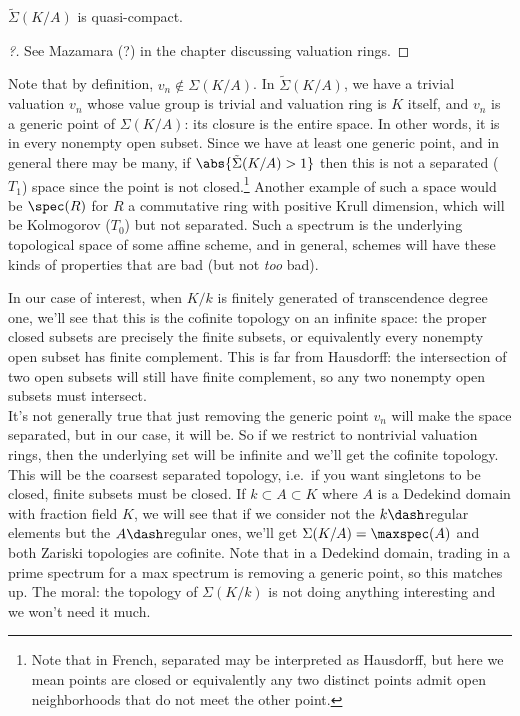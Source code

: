 \begin{theorem}[Zariski]

\(\tilde \Sigma(K/A)\) is quasi-compact.

\end{theorem}

\begin{proof}[?]

See Mazamara (?) in the chapter discussing valuation rings.

\end{proof}

Note that by definition, \(v_n \not\in \Sigma(K/A)\). In
\(\tilde \Sigma(K/A)\), we have a trivial valuation \(v_n\) whose value
group is trivial and valuation ring is \(K\) itself, and \(v_n\) is a
generic point of \(\Sigma(K/A)\): its closure is the entire space. In
other words, it is in every nonempty open subset. Since we have at least
one generic point, and in general there may be many, if
\(\abs{\tilde\Sigma(K/A) > 1}\) then this is not a separated (\(T_1\))
space since the point is not closed.\footnote{Note that in French,
  separated may be interpreted as Hausdorff, but here we mean points are
  closed or equivalently any two distinct points admit open
  neighborhoods that do not meet the other point.} Another example of
such a space would be \(\spec(R)\) for \(R\) a commutative ring with
positive Krull dimension, which will be Kolmogorov (\(T_0\)) but not
separated. Such a spectrum is the underlying topological space of some
affine scheme, and in general, schemes will have these kinds of
properties that are bad (but not \emph{too} bad).

In our case of interest, when \(K/k\) is finitely generated of
transcendence degree one, we'll see that this is the cofinite topology
on an infinite space: the proper closed subsets are precisely the finite
subsets, or equivalently every nonempty open subset has finite
complement. This is far from Hausdorff: the intersection of two open
subsets will still have finite complement, so any two nonempty open
subsets must intersect.\\

It's not generally true that just removing the generic point \(v_n\)
will make the space separated, but in our case, it will be. So if we
restrict to nontrivial valuation rings, then the underlying set will be
infinite and we'll get the cofinite topology. This will be the coarsest
separated topology, i.e.~if you want singletons to be closed, finite
subsets must be closed. If \(k \subset A \subset K\) where \(A\) is a
Dedekind domain with fraction field \(K\), we will see that if we
consider not the \(k\dash\)regular elements but the \(A\dash\)regular
ones, we'll get \(\Sigma(K/A) = \maxspec(A)\) and both Zariski
topologies are cofinite. Note that in a Dedekind domain, trading in a
prime spectrum for a max spectrum is removing a generic point, so this
matches up. The moral: the topology of \(\Sigma(K/k)\) is not doing
anything interesting and we won't need it much.

